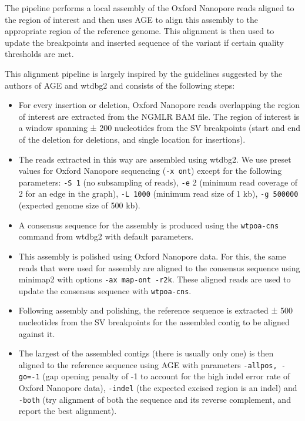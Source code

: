 \documentclass[12pt]{article}
\begin{document}
The pipeline performs a local assembly of the Oxford Nanopore reads aligned to the region of interest and then uses AGE \citep{age} to align this assembly to the appropriate region of the reference genome.
This alignment is then used to update the breakpoints and inserted sequence of the variant if certain quality thresholds are met.

This alignment pipeline is largely inspired by the guidelines suggested by the authors of AGE and wtdbg2 \citep{wtdbg2} and consists of the following steps:

\begin{itemize}
	\item For every insertion or deletion, Oxford Nanopore reads overlapping the region of interest are extracted from the NGMLR \citep{ngmlr} BAM file. 
		The region of interest is a window spanning ± 200 nucleotides from the SV breakpoints (start and end of the deletion for deletions, and single location for insertions).
\item  The reads extracted in this way are assembled using wtdbg2. 
	We use preset values for Oxford Nanopore sequencing (\texttt{-x ont}) except for the following parameters: \texttt{-S 1} (no subsampling of reads), \texttt{-e} 2 (minimum read coverage of 2 for an edge in the graph), \texttt{-L 1000} (minimum read size of 1 kb), \texttt{-g 500000} (expected genome size of 500 kb).
\item A consensus sequence for the assembly is produced using the \texttt{wtpoa-cns} command from wtdbg2 with default parameters.
\item This assembly is polished using Oxford Nanopore data. For this, the same reads that were used for assembly are aligned to the consensus sequence using minimap2 \citep{minimap2} with options \texttt{-ax map-ont -r2k}. These aligned reads are used to update the consensus sequence with \texttt{wtpoa-cns}.
\item Following assembly and polishing, the reference sequence is extracted ± 500 nucleotides from the SV breakpoints for the assembled contig to be aligned against it.
\item The largest of the assembled contigs (there is usually only one) is then aligned to the reference sequence using AGE with parameters \texttt{-allpos, -go=-1} (gap opening penalty of -1 to account for the high indel error rate of Oxford Nanopore data), \texttt{-indel} (the expected excised region is an indel) and \texttt{-both} (try alignment of both the sequence and its reverse complement, and report the best alignment).
\end{itemize}
\end{document}
